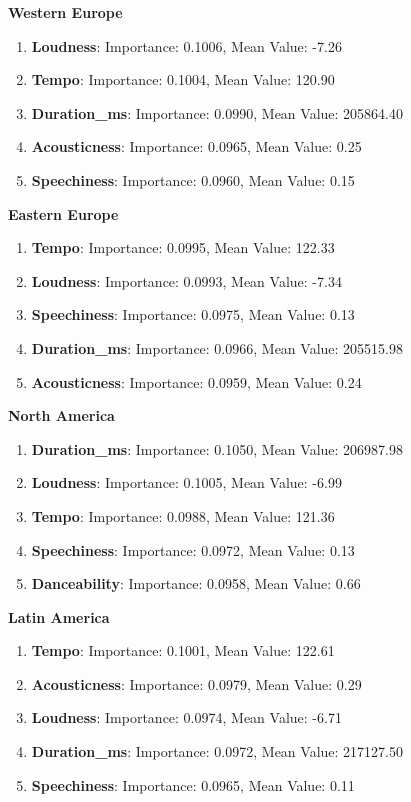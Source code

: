 \textbf{Western Europe}
\begin{enumerate}
    \item \textbf{Loudness}: Importance: 0.1006, Mean Value: -7.26
    \item \textbf{Tempo}: Importance: 0.1004, Mean Value: 120.90
    \item \textbf{Duration\_ms}: Importance: 0.0990, Mean Value: 205864.40
    \item \textbf{Acousticness}: Importance: 0.0965, Mean Value: 0.25
    \item \textbf{Speechiness}: Importance: 0.0960, Mean Value: 0.15
\end{enumerate}

\textbf{Eastern Europe}
\begin{enumerate}
    \item \textbf{Tempo}: Importance: 0.0995, Mean Value: 122.33
    \item \textbf{Loudness}: Importance: 0.0993, Mean Value: -7.34
    \item \textbf{Speechiness}: Importance: 0.0975, Mean Value: 0.13
    \item \textbf{Duration\_ms}: Importance: 0.0966, Mean Value: 205515.98
    \item \textbf{Acousticness}: Importance: 0.0959, Mean Value: 0.24
\end{enumerate}

\textbf{North America}
\begin{enumerate}
    \item \textbf{Duration\_ms}: Importance: 0.1050, Mean Value: 206987.98
    \item \textbf{Loudness}: Importance: 0.1005, Mean Value: -6.99
    \item \textbf{Tempo}: Importance: 0.0988, Mean Value: 121.36
    \item \textbf{Speechiness}: Importance: 0.0972, Mean Value: 0.13
    \item \textbf{Danceability}: Importance: 0.0958, Mean Value: 0.66
\end{enumerate}


\textbf{Latin America}
\begin{enumerate}
    \item \textbf{Tempo}: Importance: 0.1001, Mean Value: 122.61
    \item \textbf{Acousticness}: Importance: 0.0979, Mean Value: 0.29
    \item \textbf{Loudness}: Importance: 0.0974, Mean Value: -6.71
    \item \textbf{Duration\_ms}: Importance: 0.0972, Mean Value: 217127.50
    \item \textbf{Speechiness}: Importance: 0.0965, Mean Value: 0.11
\end{enumerate}

